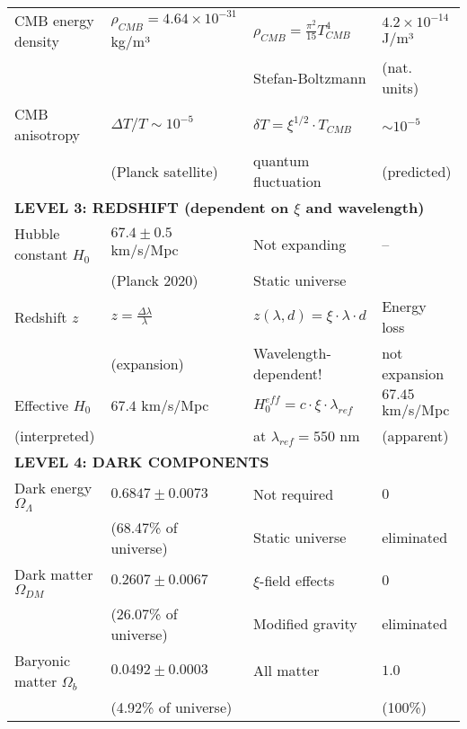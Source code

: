 \documentclass[12pt,a4paper]{article}
\begin{document}
\begin{longtable}{p{5cm}p{4cm}p{3.5cm}p{3.5cm}}
	CMB energy density & $\rho_{CMB} = 4.64 \times 10^{-31}$ kg/m³ & $\rho_{CMB} = \frac{\pi^2}{15} T_{CMB}^4$ & $4.2 \times 10^{-14}$ J/m³ \\
	& & Stefan-Boltzmann & (nat. units) \\[0.3em]
	
	CMB anisotropy & $\Delta T/T \sim 10^{-5}$ & $\delta T = \xi^{1/2} \cdot T_{CMB}$ & $\sim 10^{-5}$ \\
	& (Planck satellite) & quantum fluctuation & (predicted) \\[0.3em]
	
	\midrule
	\multicolumn{4}{l}{\textbf{LEVEL 3: REDSHIFT (dependent on $\xi$ and wavelength)}} \\
	\midrule
	
	Hubble constant $H_0$ & $67.4 \pm 0.5$ km/s/Mpc & Not expanding & -- \\
	& (Planck 2020) & Static universe & \\[0.3em]
	
	Redshift $z$ & $z = \frac{\Delta\lambda}{\lambda}$ & $z(\lambda, d) = \xi \cdot \lambda \cdot d$ & Energy loss \\
	& (expansion) & Wavelength-dependent! & not expansion \\[0.3em]
	
	Effective $H_0$ & $67.4$ km/s/Mpc & $H_0^{eff} = c \cdot \xi \cdot \lambda_{ref}$ & $67.45$ km/s/Mpc \\
	(interpreted) & & at $\lambda_{ref} = 550$ nm & (apparent) \\[0.3em]
	
	\midrule
	\multicolumn{4}{l}{\textbf{LEVEL 4: DARK COMPONENTS}} \\
	\midrule
	
	Dark energy $\Omega_\Lambda$ & $0.6847 \pm 0.0073$ & Not required & $0$ \\
	& (68.47\% of universe) & Static universe & eliminated \\[0.3em]
	
	Dark matter $\Omega_{DM}$ & $0.2607 \pm 0.0067$ & $\xi$-field effects & $0$ \\
	& (26.07\% of universe) & Modified gravity & eliminated \\[0.3em]
	
	Baryonic matter $\Omega_b$ & $0.0492 \pm 0.0003$ & All matter & $1.0$ \\
	& (4.92\% of universe) & & (100\%) \\[0.3em]
	

\end{longtable}
\end{document}
